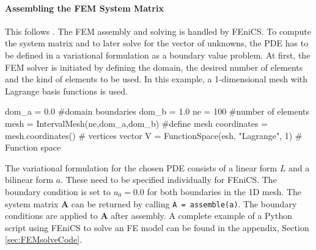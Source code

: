 \documentclass[%
  a4paper,oneside,%
  11pt,%
  smallchapters,
  style=printdev,
  extramargin,
  green,%
  rgb, <cmyk>
  ]{tubsbook}
\begin{document}
\paragraph{Assembling the FEM System Matrix}
This follows \cite{langtangen2016}. The FEM assembly and solving is handled by FEniCS. To compute the system matrix and to later solve for the vector of unknowns, the PDE has to be defined in a variational formulation as a boundary value problem.
At first, the FEM solver is initiated by defining the domain, the desired number of elements and the kind of elements to be used. In this example, a 1-dimensional mesh with Lagrange basis functions is used.
\begin{python}
dom_a = 0.0 #domain boundaries
dom_b = 1.0
ne	= 100 #number of elements
mesh = IntervalMesh(ne,dom_a,dom_b) #define mesh
coordinates = mesh.coordinates() # vertices vector
V = FunctionSpace(esh, "Lagrange", 1) # Function space
\end{python}
The variational formulation for the chosen PDE consists of a linear form $L$ and a bilinear form $a$. These need to be specified individually for FEniCS. The boundary condition is set to $u_0 = 0.0$ for both boundaries in the 1D mesh. The system matrix $\bm{A}$ can be returned by calling \texttt{A = assemble(a)}. The boundary conditions are applied to $\bm{A}$ after assembly. A complete example of a Python script using FEniCS to solve an FE model can be found in the appendix, Section \ref{sec:FEMsolveCode}.
\end{document}
